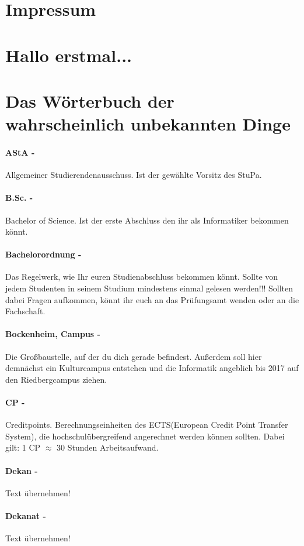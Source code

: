 \documentclass[12pt,a4paper]{article}
\author{Simon Pruy}
\begin{document}
	\tableofcontents
\section{Impressum}
\section{Hallo erstmal...}
\section{Das Wörterbuch der wahrscheinlich unbekannten Dinge}
	\paragraph{AStA -} \glqq Allgemeiner Studierendenausschuss\grqq . Ist der gewählte Vorsitz des StuPa.
	\paragraph{B.Sc. -}\glqq Bachelor of Science\grqq . Ist der erste Abschluss den ihr als Informatiker bekommen könnt.
	\paragraph{Bachelorordnung -} Das Regelwerk, wie Ihr euren Studienabschluss bekommen könnt. Sollte von jedem Studenten in seinem Studium mindestens einmal gelesen werden!!! Sollten dabei Fragen aufkommen, könnt ihr euch an das Prüfungsamt wenden oder an die Fachschaft.
	\paragraph{Bockenheim, Campus -} Die Großbaustelle, auf der du dich gerade befindest. Außerdem soll hier demnächst ein Kulturcampus entstehen und die Informatik angeblich bis 2017 auf den Riedbergcampus ziehen.
	\paragraph{CP -} \glqq Creditpoints\grqq . Berechnungseinheiten des ECTS(European Credit Point Transfer System), die hochschulübergreifend angerechnet werden können sollten. Dabei gilt: 1 CP $\approx$ 30 Stunden Arbeitsaufwand.
	\paragraph{Dekan -} Text übernehmen!
	\paragraph{Dekanat -} Text übernehmen!
\end{document}
